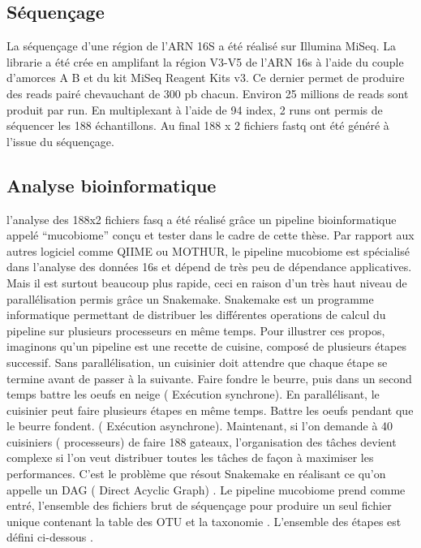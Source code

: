 \documentclass[12pt,a4paper]{article}
\begin{document}
\subsection{Séquençage}

La séquençage d’une région de l’ARN 16S a été réalisé sur Illumina MiSeq.
La librarie a été crée en amplifant la région V3-V5 de l’ARN 16s à l’aide du couple d’amorces A B et du kit MiSeq Reagent Kits v3.
Ce dernier permet de produire des reads pairé chevauchant de 300 pb chacun. Environ 25 millions de reads sont produit par run.
En multiplexant à l’aide de 94 index, 2 runs ont permis de séquencer les 188 échantillons.
Au final 188 x 2 fichiers fastq ont été généré à l’issue du séquençage.

\subsection{Analyse bioinformatique}

l’analyse des 188x2 fichiers fasq a été réalisé grâce un pipeline bioinformatique appelé “mucobiome” conçu et tester dans le cadre de cette thèse. Par rapport aux autres logiciel comme QIIME ou MOTHUR, le pipeline mucobiome est spécialisé dans l’analyse des données 16s et dépend de très peu de dépendance applicatives. Mais il est surtout beaucoup plus rapide, ceci en raison d’un très haut niveau de parallélisation permis grâce un Snakemake. Snakemake est un programme informatique permettant de distribuer les différentes operations de calcul du pipeline sur plusieurs processeurs en même temps. Pour illustrer ces propos, imaginons qu’un pipeline est une recette de cuisine, composé de plusieurs étapes successif. Sans parallélisation, un cuisinier doit attendre que chaque étape se termine avant de passer à la suivante. Faire fondre le beurre, puis dans un second temps battre les oeufs en neige ( Exécution synchrone). En parallélisant, le cuisinier peut faire plusieurs étapes en même temps. Battre les oeufs pendant que le beurre fondent. ( Exécution asynchrone). Maintenant, si l’on demande à 40 cuisiniers ( processeurs) de faire 188 gateaux, l’organisation des tâches devient complexe si l’on veut distribuer toutes les tâches de façon à maximiser les performances. C’est le problème que résout Snakemake en réalisant ce qu’on appelle un DAG ( Direct Acyclic Graph) .
Le pipeline mucobiome prend comme entré, l’ensemble des fichiers brut de séquençage pour produire un seul fichier unique contenant la table des OTU et la taxonomie . L’ensemble des étapes est défini ci-dessous .
\end{document}
